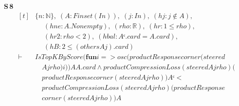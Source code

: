 \noindent\textbf{S\,8}\quad{}
{\footnotesize\[ \begin{aligned}[t]
&\{ \mathit{n} : \mathbb{N} \},\; (\mathit{A} : \mathit{Finset} (\mathit{I} \mathit{n})),\; (\mathit{j} : \mathit{I} \mathit{n}),\; (\mathit{hj} : \mathit{j} \notin \mathit{A}),\\
&\quad \; (\mathit{hne} : \mathit{A}.\mathit{Nonempty}),\; (\mathit{rho} : \mathbb{R} ),\; (\mathit{hr} : 1 \leq \mathit{rho}),\\
&\quad \; (\mathit{hr2} : \mathit{rho} < 2),\; (\mathit{hbal} : \mathit{Aᶜ}.\mathit{card}=\mathit{A}.\mathit{card}),\\
&\quad \; (\mathit{hB} : 2 \leq (\mathit{others} \mathit{A} \mathit{j}).\mathit{card})\\
\vdash\;&\mathit{IsTopKByScore} (\mathbf{fun} \mathit{i} => \mathit{osc} (\mathit{productResponse} \mathit{corner} (\mathit{steered}\\
&\quad \mathit{A} \mathit{j} \mathit{rho}) \mathit{i})) \mathit{A} \mathit{A}.\mathit{card} \wedge \mathit{productCompressionLoss} (\mathit{steered} \mathit{A} \mathit{j} \mathit{rho}) (\\
&\quad \mathit{productResponse} \mathit{corner} (\mathit{steered} \mathit{A} \mathit{j} \mathit{rho})) \mathit{Aᶜ} <\\
&\quad \mathit{productCompressionLoss} (\mathit{steered} \mathit{A} \mathit{j} \mathit{rho}) (\mathit{productResponse}\\
&\quad \mathit{corner} (\mathit{steered} \mathit{A} \mathit{j} \mathit{rho})) \mathit{A}
\end{aligned} \]}

